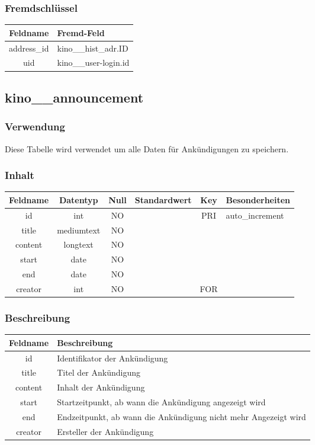 \subsubsection{Fremdschlüssel}
\begin{table}[H]
	\begin{tabular}{|c|p{12.5cm}|}
		\hline
		\textbf{Feldname} & \textbf{Fremd-Feld} \\ \hline
		address\_id & kino\_\_hist\_adr.ID \\ \hline
		uid & kino\_\_user-login.id \\ \hline
	\end{tabular}
\end{table}
\subsection{kino\_\_announcement}
\subsubsection{Verwendung} Diese Tabelle wird verwendet um alle Daten für Ankündigungen zu speichern.
\subsubsection{Inhalt}
\begin{table}[H]
	\begin{tabular}{|c|c|c|c|c|p{3.5cm}|}
		\hline
		\textbf{Feldname} & \textbf{Datentyp} & \textbf{Null} & \textbf{Standardwert} & \textbf{Key}   & \textbf{Besonderheiten} \\ \hline
		id & int & NO &  & PRI & auto\_increment  \\ \hline
		title & mediumtext & NO &  &  &  \\ \hline
		content & longtext & NO &  &  &  \\ \hline
		start & date & NO &  &  &  \\ \hline
		end & date & NO &  &  &  \\ \hline
		creator & int & NO &  & FOR &  \\ \hline
	\end{tabular}
\end{table}
\subsubsection{Beschreibung}
\begin{table}[H]
	\begin{tabular}{|c|p{12cm}|}
		\hline
		\textbf{Feldname} & \textbf{Beschreibung} \\ \hline
		id & Identifikator der Ankündigung \\ \hline
		title & Titel der Ankündigung \\ \hline
		content & Inhalt der Ankündigung \\ \hline
		start & Startzeitpunkt, ab wann die Ankündigung angezeigt wird \\ \hline
		end & Endzeitpunkt, ab wann die Ankündigung nicht mehr Angezeigt wird \\ \hline
		creator & Ersteller der Ankündigung \\ \hline
	\end{tabular}
\end{table}
